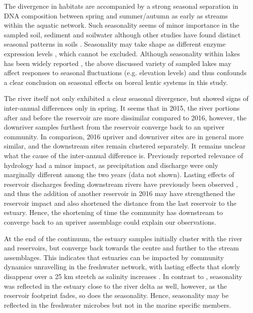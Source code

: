 \documentclass[12pt,a4paper]{article} %
\begin{document}
The divergence in habitats are accompanied by a strong seasonal separation in DNA composition between spring and summer/autumn as early as streams within the aquatic network. Such seasonality seems of minor importance in the sampled soil, sediment and soilwater although other studies have found distinct seasonal patterns in soils \citep{Shigyo2019, Rasche2011c}. Seasonality may take shape as different enzyme expression levels \citep{Kaiser2010c}, which cannot be excluded. Although seasonality within lakes has been widely reported \citep{Crump2003, Kara2013, Nino-Garcia2017a}, the above discussed variety of sampled lakes may affect responses to seasonal fluctuations (e.g. elevation levels) and thus confounds a clear conclusion on seasonal effects on boreal lentic systems in this study.

The river itself not only exhibited a clear seasonal divergence, but showed signs of inter-annual differences only in spring. It seems that in 2015, the river portions after and before the reservoir are more dissimilar compared to 2016, however, the downriver samples furthest from the reservoir converge back to an upriver community. In comparison, 2016 upriver and downriver sites are in general more similar, and the downstream sites remain clustered separately. It remains unclear what the cause of the inter-annual difference is. Previously reported relevance of hydrology \citep{Nino-Garcia2016} had a minor impact, as precipitation and discharge were only marginally different among the two years (data not shown). Lasting effects of reservoir discharges feeding downstream rivers have previously been observed \citep{Ruiz-Gonzalez2013, Ruiz-Gonzalez2015a, Reis2020}, and thus the addition of another reservoir in 2016 may have strengthened the reservoir impact and also shortened the distance from the last reservoir to the estuary. Hence, the shortening of time the community has downstream to converge back to an upriver assemblage could explain our observations.

At the end of the continuum, the estuary samples initially cluster with the river and reservoirs, but converge back towards the centre and further to the stream assemblages. This indicates that estuaries can be impacted by community dynamics unravelling in the freshwater network, with lasting effects \citep{Hauptmann2016} that slowly disappear over a 25 km stretch as salinity increases \citep{Bouvier2002, Crump2004}. In contrast to \citet{Doherty2017}, seasonality was reflected in the estuary close to the river delta as well, however, as the reservoir footprint fades, so does the seasonality. Hence, seasonality may be reflected in the freshwater microbes but not in the marine specific members.
\end{document}
